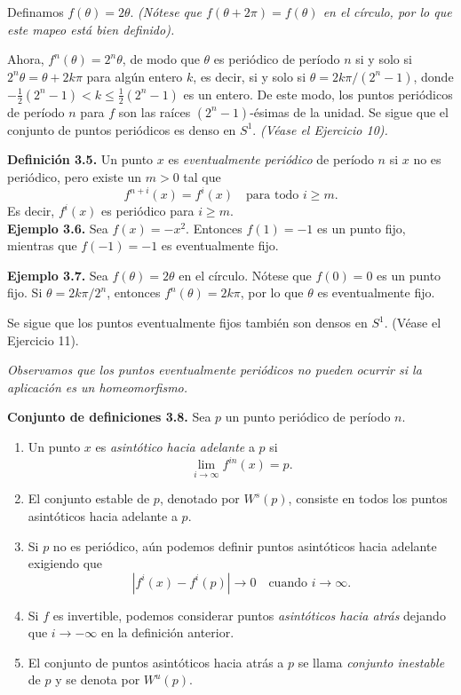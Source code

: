 \documentclass[10pt,a4paper]{book}
\begin{document}
Definamos $f(\theta)=2\theta$. \textit{(Nótese que $f(\theta + 2\pi) = f(\theta)$ en el círculo, por lo que este mapeo está bien definido).  }

Ahora, $f^{n}(\theta) = 2^{n}\theta$, de modo que $\theta$ es periódico de período $n$ si y solo si $2^{n}\theta = \theta + 2k\pi$ para algún entero $k$, es decir, si y solo si $\theta = 2k\pi/(2^{n}-1)$, donde $- \frac{1}{2}(2^{n}-1) < k \le \frac{1}{2}(2^{n}-1)$ es un entero. De este modo, los puntos periódicos de período $n$ para $f$ son las raíces $(2^{n}-1)$-ésimas de la unidad. Se sigue que el conjunto de puntos periódicos es denso en $S^{1}$. \textit{(Véase el Ejercicio 10).}


\newpage

\textbf{Definición 3.5.} Un punto $x$ es \emph{eventualmente periódico} de período $n$ si $x$ no es periódico, 
pero existe un $m>0$ tal que 
\[
f^{n+i}(x) = f^{i}(x) \quad \text{para todo } i \geq m.
\]
Es decir, $f^{i}(x)$ es periódico para $i \geq m$.
\\

\textbf{Ejemplo 3.6.} Sea $f(x) = -x^{2}$. Entonces $f(1) = -1$ es un punto fijo, mientras que 
$f(-1) = -1$ es eventualmente fijo.

\medskip

\textbf{Ejemplo 3.7.} Sea $f(\theta) = 2\theta$ en el círculo.  
Nótese que $f(0)=0$ es un punto fijo.  
Si $\theta = 2k\pi/2^{n}$, entonces $f^{n}(\theta) = 2k\pi$, por lo que $\theta$ es eventualmente fijo.  

Se sigue que los puntos eventualmente fijos también son densos en $S^{1}$.  
(Véase el Ejercicio 11).

\medskip

\textit{Observamos que los puntos eventualmente periódicos no pueden ocurrir si la aplicación es un homeomorfismo.}

\newpage

\textbf{Conjunto de definiciones 3.8.} Sea $p$ un punto periódico de período $n$. 
\begin{enumerate}
	\item Un punto $x$ es \emph{asintótico hacia adelante} a $p$ si 
\[
\lim_{i \to \infty} f^{in}(x) = p.
\]
	\item El conjunto estable de $p$, denotado por $W^{s}(p)$, consiste en todos los puntos asintóticos hacia adelante a $p$.
	\item Si $p$ no es periódico, aún podemos definir puntos asintóticos hacia adelante exigiendo que 
\[
|f^{i}(x) - f^{i}(p)| \to 0 \quad \text{cuando } i \to \infty.
\]
	\item Si $f$ es invertible, podemos considerar puntos \emph{asintóticos hacia atrás} dejando que $i \to -\infty$ en la definición anterior. 
	
	\item El conjunto de puntos asintóticos hacia atrás a $p$ se llama \emph{conjunto inestable} de $p$ y se denota por $W^{u}(p)$.
\end{enumerate}
\end{document}
